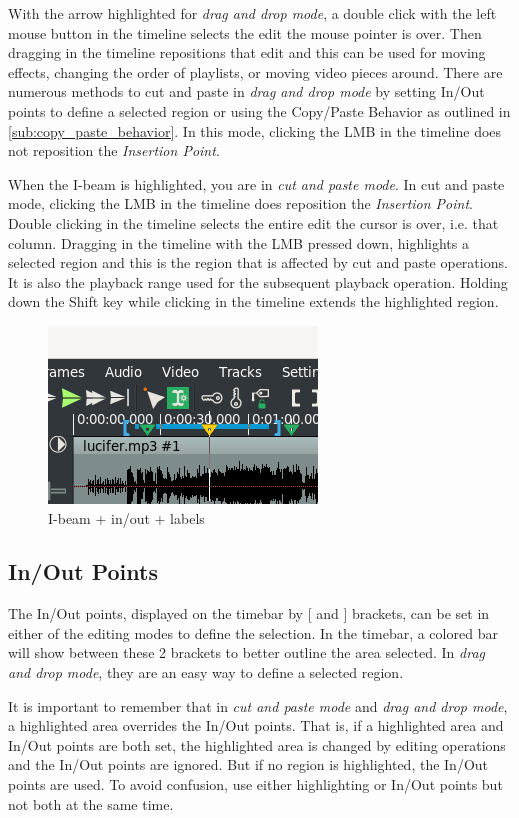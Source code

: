 With the arrow highlighted for \emph{drag and drop mode}, a double click with the left mouse button in the timeline selects the edit the mouse pointer is over. 
Then dragging in the timeline repositions that edit and this can be used for moving effects,
changing the order of playlists, or moving video pieces around. 
There are numerous methods to cut and paste in \emph{drag and drop mode} by setting In/Out points to define
a selected region or using the Copy/Paste Behavior as outlined in \ref{sub:copy_paste_behavior}. 
In this mode, clicking the LMB in the timeline does not reposition the \textit{Insertion Point}. 

When the I-beam is highlighted, you are in \emph{cut and paste mode}.
In cut and paste mode, clicking the LMB in the timeline does reposition the \textit{Insertion Point}. 
Double clicking in the timeline selects the entire edit the cursor is over, i.e. that column. 
Dragging in the timeline with the LMB pressed down, highlights a selected region and this is the region that is affected by cut
and paste operations.  It is also the playback range used for the subsequent playback operation. 
Holding down the Shift key while clicking in the timeline extends the highlighted region.

\begin{figure}[htpb]
    \centering
    \includegraphics[width=0.4\linewidth]{images/i-beam.png}
    \caption{I-beam + in/out  +  labels}
    \label{fig:i-beam}
\end{figure}

\subsection{In/Out Points}%
\label{sub:in_out_points}

The In/Out points, displayed on the timebar by [ and ] brackets,  can be set in either of the editing modes to define the selection.
In the timebar, a colored bar will show between these 2 brackets to better outline the area selected.
In \emph{drag and drop mode}, they are an easy way to define a selected region.

It is important to remember that in \emph{cut and paste mode} and \emph{drag and drop mode}, a highlighted area 
overrides the In/Out points. That is, if a highlighted area and In/Out points are both set, the highlighted area is changed by editing operations and the In/Out points are ignored. 
But if no region is highlighted, the In/Out points are used. 
To avoid confusion, use either highlighting or In/Out points but not both at the same time.

